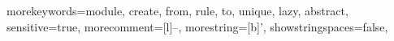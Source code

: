 {morekeywords={module, create, from, rule, to, unique, lazy, abstract},
sensitive=true,
morecomment=[l]{--},
morestring=[b]',
showstringspaces=false,
}